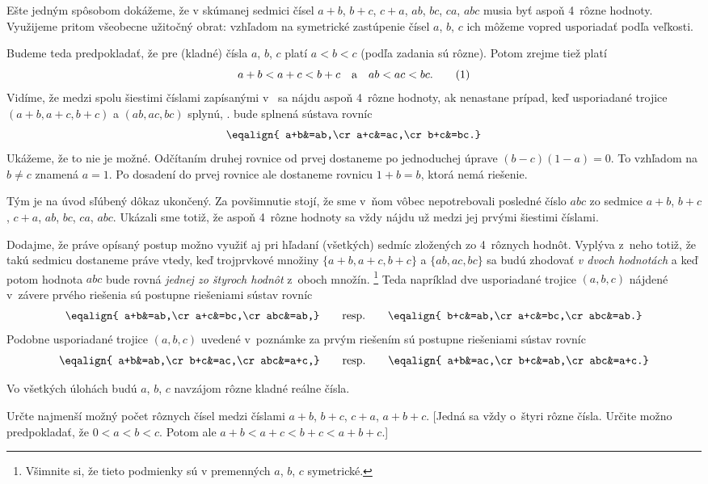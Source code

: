 {\ineriesenie
Ešte jedným spôsobom dokážeme, že v skúmanej sedmici
čísel $a+b$, $b+c$, $c+a$, $ab$, $bc$, $ca$, $abc$ musia byť aspoň
4~rôzne hodnoty. Využijeme pritom všeobecne užitočný obrat: vzhľadom
na symetrické zastúpenie čísel $a$, $b$, $c$
ich môžeme vopred usporiadať podľa veľkosti.

Budeme teda predpokladať, že pre (kladné) čísla $a$, $b$, $c$ platí
$a<b<c$ (podľa zadania sú rôzne). Potom zrejme tiež platí
$$
a+b<a+c<b+c\quad\hbox{a}\quad ab<ac<bc.
\tag1
$$
Vidíme, že medzi spolu šiestimi číslami zapísanými v~ sa
nájdu aspoň 4~rôzne hodnoty, ak nenastane prípad,
keď usporiadané trojice $(a+b,a+c,b+c)$ a $(ab,ac,bc)$ splynú,
\tj. bude splnená sústava rovníc
$$\eqalign{
a+b&=ab,\cr
a+c&=ac,\cr
b+c&=bc.}
$$
Ukážeme, že to nie je možné. Odčítaním druhej rovnice od prvej
dostaneme po jednoduchej úprave $(b-c)(1-a)=0$.
To vzhľadom na $b\ne c$ znamená $a=1$. Po dosadení
do prvej rovnice ale dostaneme rovnicu $1+b=b$, ktorá nemá riešenie.

Tým je na úvod sľúbený dôkaz ukončený. Za povšimnutie stojí, že sme
v~ňom vôbec nepotrebovali posledné číslo $abc$ zo sedmice
$a+b$, $b+c$, $c+a$, $ab$, $bc$, $ca$, $abc$. Ukázali sme totiž,
že aspoň 4~rôzne hodnoty sa vždy nájdu už medzi jej prvými
šiestimi číslami.

Dodajme, že práve opísaný postup možno využiť aj pri hľadaní (všetkých)
sedmíc zložených zo 4~rôznych hodnôt. Vyplýva z~neho totiž,
že takú sedmicu dostaneme práve vtedy, keď trojprvkové
množiny $\{a+b,a+c,b+c\}$ a $\{ab,ac,bc\}$ sa budú zhodovať
{\it v dvoch hodnotách\/} a keď potom hodnota $abc$ bude rovná
{\it jednej zo štyroch hodnôt\/} z~oboch množín.%
\footnote{Všimnite si, že tieto podmienky sú v premenných $a$,
$b$, $c$ symetrické.} Teda napríklad dve usporiadané trojice $(a,b,c)$
nájdené v~závere prvého riešenia sú postupne riešeniami sústav rovníc
$$
\eqalign{
a+b&=ab,\cr
a+c&=bc,\cr
abc&=ab,}
\qquad\hbox{resp.}\qquad
\eqalign{
b+c&=ab,\cr
a+c&=bc,\cr
abc&=ab.}
$$
Podobne usporiadané trojice $(a,b,c)$ uvedené v~poznámke za prvým
riešením sú postupne riešeniami sústav rovníc
$$
\eqalign{
a+b&=ab,\cr
b+c&=ac,\cr
abc&=a+c,}
\qquad\hbox{resp.}\qquad
\eqalign{
a+b&=ac,\cr
b+c&=ab,\cr
abc&=a+c.}
$$

\titem
Vo všetkých úlohách budú $a$, $b$, $c$ navzájom
rôzne kladné reálne čísla.

Určte najmenší možný počet rôznych čísel medzi
číslami $a+b$, $b+c$, $c+a$, $a+b+c$.
[Jedná sa vždy o~štyri rôzne čísla. Určite možno predpokladať, že
$0<a<b<c$. Potom ale $a+b<a+c<b+c<a+b+c$.]

}
